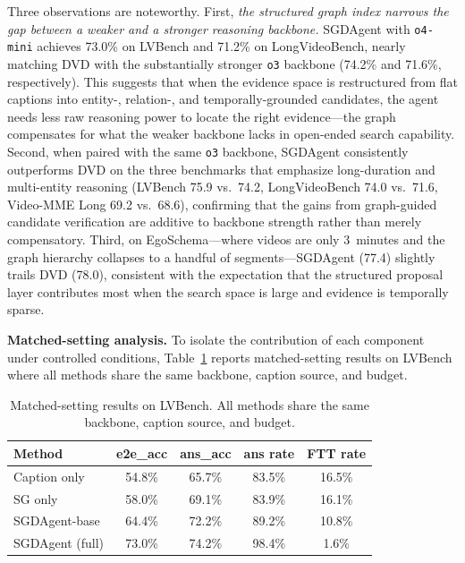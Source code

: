 \documentclass[sigconf, screen, review, anonymous]{acmart}
\begin{document}
Three observations are noteworthy.  First, \emph{the structured graph index
narrows the gap between a weaker and a stronger reasoning backbone.}
SGDAgent with \texttt{o4-mini} achieves 73.0\% on LVBench and 71.2\% on
LongVideoBench, nearly matching DVD with the substantially stronger
\texttt{o3} backbone (74.2\% and 71.6\%, respectively).  This suggests
that when the evidence space is restructured from flat captions into
entity-, relation-, and temporally-grounded candidates, the agent needs
less raw reasoning power to locate the right evidence---the graph
compensates for what the weaker backbone lacks in open-ended search
capability.  Second, when paired with the same \texttt{o3} backbone,
SGDAgent consistently outperforms DVD on the three benchmarks that
emphasize long-duration and multi-entity reasoning (LVBench 75.9 vs.\
74.2, LongVideoBench 74.0 vs.\ 71.6, Video-MME Long 69.2 vs.\ 68.6),
confirming that the gains from graph-guided candidate verification are
additive to backbone strength rather than merely compensatory.  Third,
on EgoSchema---where videos are only 3~minutes and the graph hierarchy
collapses to a handful of segments---SGDAgent (77.4) slightly trails DVD
(78.0), consistent with the expectation that the structured proposal
layer contributes most when the search space is large and evidence is
temporally sparse.

\textbf{Matched-setting analysis.}\quad
To isolate the contribution of each component under controlled conditions,
Table~\ref{tab:main} reports matched-setting results on LVBench where all
methods share the same backbone, caption source, and budget.

\begin{table}[t]
  \centering
  \caption{Matched-setting results on LVBench.
           All methods share the same backbone, caption source, and budget.}
  \label{tab:main}
  \begin{tabular}{lcccc}
    \toprule
    Method & e2e\_acc & ans\_acc & ans rate & FTT rate \\
    \midrule
    Caption only          & 54.8\% & 65.7\% & 83.5\% & 16.5\% \\
    SG only               & 58.0\% & 69.1\% & 83.9\% & 16.1\% \\
    SGDAgent-base         & 64.4\% & 72.2\% & 89.2\% & 10.8\% \\
    SGDAgent (full)       & 73.0\% & 74.2\% & 98.4\% & 1.6\%  \\
    \bottomrule
  \end{tabular}
\end{table}
\end{document}
